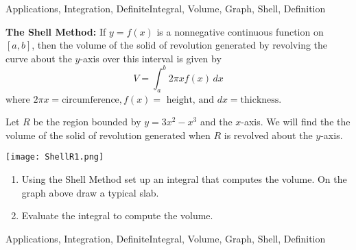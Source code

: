 \begin{tagblock}{Applications, Integration, DefiniteIntegral, Volume, Graph, Shell, Definition}
\begin{question}
	


\textbf{The Shell Method:} If $y=f(x)$ is a nonnegative continuous function on $[a,b]$, then the volume of the solid of revolution generated by revolving the curve about the 
$y$-axis over this interval is given by
\[ V = \int_a^b 2\pi x f(x) \, dx \]
where $2\pi x = \text{circumference}, f(x) = \text{ height, and } dx = \text{thickness}. $

Let  $R$ be the region bounded by $y=3x^2 - x^3$ and the $x$-axis.   We will find the  the volume of the  solid of revolution generated when $R$ is revolved about the $y$-axis. 

\texttt{[image: ShellR1.png]}

\begin{enumerate}
\item Using the Shell Method set up an integral that computes the volume.  On the graph above draw a typical slab.  

\vspace{1in}

\item Evaluate the integral to compute the volume.  
\vspace{2in}

\end{enumerate}




    
\begin{tags}
       Applications, Integration, DefiniteIntegral, Volume, Graph, Shell, Definition
\end{tags}
    
\begin{diary}
        
\end{diary}
	
\begin{solution}

\end{solution}
	
\end{question}

\end{tagblock}

